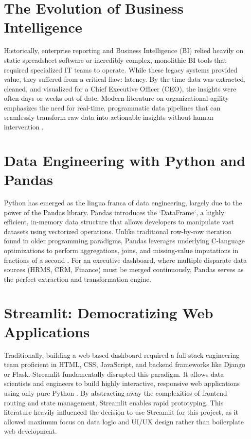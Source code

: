 \documentclass{book}
\begin{document}
\section{The Evolution of Business Intelligence}
Historically, enterprise reporting and Business Intelligence (BI) relied heavily on static spreadsheet software or incredibly complex, monolithic BI tools that required specialized IT teams to operate. While these legacy systems provided value, they suffered from a critical flaw: latency. By the time data was extracted, cleaned, and visualized for a Chief Executive Officer (CEO), the insights were often days or weeks out of date. Modern literature on organizational agility emphasizes the need for real-time, programmatic data pipelines that can seamlessly transform raw data into actionable insights without human intervention \cite{mckinsey_agile_2020}.

\section{Data Engineering with Python and Pandas}
Python has emerged as the lingua franca of data engineering, largely due to the power of the Pandas library. Pandas introduces the `DataFrame`, a highly efficient, in-memory data structure that allows developers to manipulate vast datasets using vectorized operations. Unlike traditional row-by-row iteration found in older programming paradigms, Pandas leverages underlying C-language optimizations to perform aggregations, joins, and missing-value imputations in fractions of a second \cite{mckinney2010data}. For an executive dashboard, where multiple disparate data sources (HRMS, CRM, Finance) must be merged continuously, Pandas serves as the perfect extraction and transformation engine.

\section{Streamlit: Democratizing Web Applications}
Traditionally, building a web-based dashboard required a full-stack engineering team proficient in HTML, CSS, JavaScript, and backend frameworks like Django or Flask. Streamlit fundamentally disrupted this paradigm. It allows data scientists and engineers to build highly interactive, responsive web applications using only pure Python \cite{streamlit_docs}. By abstracting away the complexities of frontend routing and state management, Streamlit enables rapid prototyping. This literature heavily influenced the decision to use Streamlit for this project, as it allowed maximum focus on data logic and UI/UX design rather than boilerplate web development.
\end{document}
